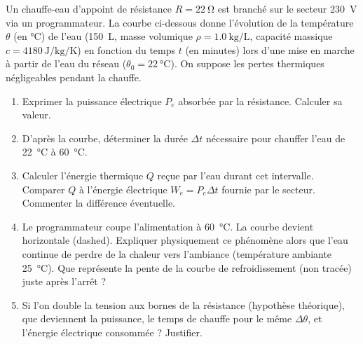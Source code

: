 \documentclass[11pt]{article}
\begin{document}
\begin{exercice}
Un chauffe-eau d'appoint de résistance $R = \SI{22}{\ohm}$ est branché sur le secteur \SI{230}{\volt} via un programmateur. La courbe ci-dessous donne l'évolution de la température $\theta$ (en \si{\celsius}) de l'eau (\SI{150}{\liter}, masse volumique $\rho = \SI{1,0}{\kilogram\per\liter}$, capacité massique $c = \SI{4180}{\joule\per\kilogram\per\kelvin}$) en fonction du temps $t$ (en minutes) lors d'une mise en marche à partir de l'eau du réseau ($\theta_0 = \SI{22}{\celsius}$). On suppose les pertes thermiques négligeables pendant la chauffe.

\begin{center}
\end{center}

\begin{enumerate}
    \item Exprimer la puissance électrique $P_e$ absorbée par la résistance. Calculer sa valeur.
    \item D'après la courbe, déterminer la durée $\Delta t$ nécessaire pour chauffer l'eau de \SI{22}{\celsius} à \SI{60}{\celsius}.
    \item Calculer l'énergie thermique $Q$ reçue par l'eau durant cet intervalle. Comparer $Q$ à l'énergie électrique $W_e = P_e \Delta t$ fournie par le secteur. Commenter la différence éventuelle.
    \item Le programmateur coupe l'alimentation à \SI{60}{\celsius}. La courbe devient horizontale (dashed). Expliquer physiquement ce phénomène alors que l'eau continue de perdre de la chaleur vers l'ambiance (température ambiante \SI{25}{\celsius}). Que représente la pente de la courbe de refroidissement (non tracée) juste après l'arrêt ?
    \item Si l'on double la tension aux bornes de la résistance (hypothèse théorique), que deviennent la puissance, le temps de chauffe pour le même $\Delta \theta$, et l'énergie électrique consommée ? Justifier.
\end{enumerate}
\end{exercice}
\end{document}
